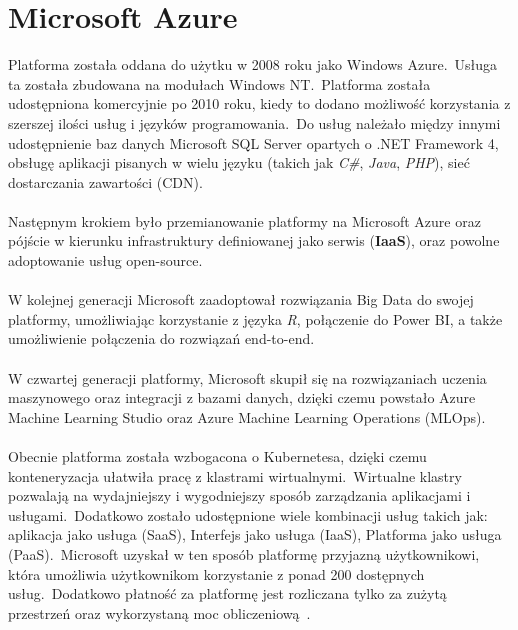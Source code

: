 \chapter{Microsoft Azure}
Platforma została oddana do użytku w 2008 roku jako Windows Azure.\ Usługa ta została zbudowana na modułach Windows NT.\ Platforma została udostępniona komercyjnie po 2010 roku, kiedy to dodano możliwość korzystania z szerszej ilości usług i języków programowania.\ Do usług należało między innymi udostępnienie baz danych Microsoft SQL Server opartych o .NET Framework 4, obsługę aplikacji pisanych w wielu języku (takich jak \textit{C\#}, \textit{Java}, \textit{PHP}), sieć dostarczania zawartości  (CDN).
\\ \\
Następnym krokiem było przemianowanie platformy na Microsoft Azure oraz pójście w kierunku infrastruktury definiowanej jako serwis  (\textbf{IaaS}), oraz powolne adoptowanie usług open-source.
\\ \\
W kolejnej generacji Microsoft zaadoptował rozwiązania Big Data do swojej platformy, umożliwiając korzystanie z języka \textit{R}, połączenie do Power BI, a także umożliwienie połączenia do rozwiązań end-to-end.
\\ \\
W czwartej generacji platformy, Microsoft skupił się na rozwiązaniach uczenia maszynowego oraz integracji z bazami danych, dzięki czemu powstało Azure Machine Learning Studio oraz Azure Machine Learning Operations (MLOps).
\\ \\
Obecnie platforma została wzbogacona o Kubernetesa, dzięki czemu konteneryzacja ułatwiła pracę z klastrami wirtualnymi.\ Wirtualne klastry pozwalają na wydajniejszy i wygodniejszy sposób zarządzania aplikacjami i usługami.\ Dodatkowo zostało udostępnione wiele kombinacji usług takich jak: aplikacja jako usługa  (SaaS), Interfejs jako usługa  (IaaS), Platforma jako usługa  (PaaS).\ Microsoft uzyskał w ten sposób platformę przyjazną użytkownikowi, która umożliwia użytkownikom korzystanie z ponad 200 dostępnych usług.\ Dodatkowo płatność za platformę jest rozliczana tylko za zużytą przestrzeń oraz wykorzystaną moc obliczeniową~\cite{Roosevelt2022, MicrosoftAzurec, Datashift}.

\vfill
\pagebreak

